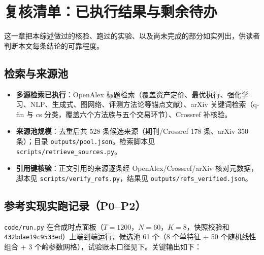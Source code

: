 \section{复核清单：已执行结果与剩余待办}\label{sec:checklist}

这一章把本综述做过的核验、跑过的实验、以及尚未完成的部分如实列出，供读者判断本文每条结论的可靠程度。

\subsection{检索与来源池}

\begin{itemize}
  \item \textbf{多源检索已执行}：OpenAlex 标题检索（覆盖资产定价、最优执行、强化学习、NLP、生成式、图网络、评测方法论等锚点文献）、arXiv 关键词检索（q-fin 与 cs 分类，覆盖六个方法族与五个交易环节）、Crossref 补核验。
  \item \textbf{来源池规模}：去重后共 528 条候选来源（期刊/Crossref 178 条、arXiv 350 条）；目录 \texttt{outputs/pool.json}。检索脚本见 \texttt{scripts/retrieve\_sources.py}。
  \item \textbf{引用键核验}：正文引用的来源逐条经 OpenAlex/Crossref/arXiv 核对元数据，脚本见 \texttt{scripts/verify\_refs.py}，结果见 \texttt{outputs/refs\_verified.json}。
\end{itemize}

\subsection{参考实现实跑记录（P0--P2）}

\texttt{code/run.py} 在合成时点面板（$T=1200$，$N=60$，$K=8$，快照校验和 \texttt{432bdae19c9533ed}）上端到端运行，候选池 61 个（8 个单特征 + 50 个随机线性组合 + 3 个岭参数网格），试验账本口径见下。关键输出如下：

